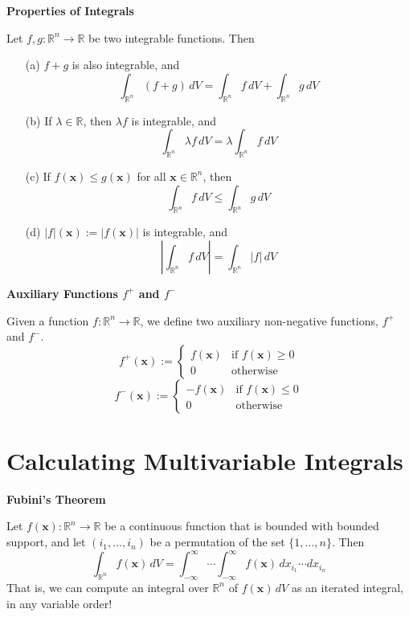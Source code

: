 \documentclass{article}
\newcommand{\R}{\mathbb{R}}
\newenvironment{definition}[1]{
    \par\noindent\textbf{#1}\par\noindent
}{
    \par \vspace{0.5cm}
}
\begin{document}
\begin{definition}{Properties of Integrals}
    Let \( f, g : \R^n \to \R \) be two integrable functions. Then
    \begin{enumerate}
        \item[(a)] \( f + g \) is also integrable, and
        \[ \int_{\R^n} (f + g) \, dV = \int_{\R^n} f \, dV + \int_{\R^n} g \, dV \]
        
        \item[(b)] If \( \lambda \in \R \), then \( \lambda f \) is integrable, and
        \[ \int_{\R^n} \lambda f \, dV = \lambda \int_{\R^n} f \, dV \]
        
        \item[(c)] If \( f(\bm{x}) \leq g(\bm{x}) \) for all \( \bm{x} \in \R^n \), then
        \[ \int_{\R^n} f \, dV \leq \int_{\R^n} g \, dV \]
        
        \item[(d)] \( |f|(\bm{x}) := |f(\bm{x})| \) is integrable, and 
        \[ \left| \int_{\R^n} f \, dV \right| = \int_{\R^n} |f| \, dV \]
    \end{enumerate}
\end{definition}

\begin{definition}{Auxiliary Functions \( f^+ \) and \( f^- \)}
    Given a function \( f : \R^n \to \R \), we define two auxiliary non-negative functions, \( f^+ \) and \( f^- \).
    \[ f^+(\bm{x}) := \begin{cases} 
    f(\bm{x}) & \text{if } f(\bm{x}) \geq 0 \\
    0 & \text{otherwise}
    \end{cases} \]
    \[ f^-(\bm{x}) := \begin{cases} 
    -f(\bm{x}) & \text{if } f(\bm{x}) \leq 0 \\
    0 & \text{otherwise}
    \end{cases} \]
\end{definition}


\section*{Calculating Multivariable Integrals}

\begin{definition}{Fubini's Theorem}
    Let \( f(\bm{x}) : \R^n \to \R \) be a continuous function that is bounded with bounded support, and let \( (i_1, \ldots, i_n) \) be a permutation of the set \( \{1, \ldots, n\} \). Then
    \[ \int_{\R^n} f(\bm{x}) \, dV = \int_{-\infty}^{\infty} \cdots \int_{-\infty}^{\infty} f(\bm{x}) \, dx_{i_1} \cdots dx_{i_n} \]
    That is, we can compute an integral over \( \R^n \) of \( f(\bm{x}) \, dV \) as an iterated integral, in any variable order!
\end{definition}
\end{document}
